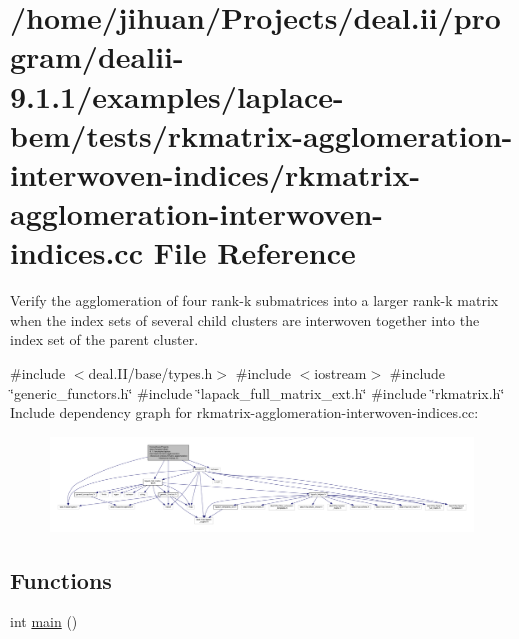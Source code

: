 \hypertarget{rkmatrix-agglomeration-interwoven-indices_8cc}{}\section{/home/jihuan/\+Projects/deal.ii/program/dealii-\/9.1.1/examples/laplace-\/bem/tests/rkmatrix-\/agglomeration-\/interwoven-\/indices/rkmatrix-\/agglomeration-\/interwoven-\/indices.cc File Reference}
\label{rkmatrix-agglomeration-interwoven-indices_8cc}


Verify the agglomeration of four rank-\/k submatrices into a larger rank-\/k matrix when the index sets of several child clusters are interwoven together into the index set of the parent cluster.  


{\ttfamily \#include $<$deal.\+I\+I/base/types.\+h$>$}\newline
{\ttfamily \#include $<$iostream$>$}\newline
{\ttfamily \#include \char`\"{}generic\+\_\+functors.\+h\char`\"{}}\newline
{\ttfamily \#include \char`\"{}lapack\+\_\+full\+\_\+matrix\+\_\+ext.\+h\char`\"{}}\newline
{\ttfamily \#include \char`\"{}rkmatrix.\+h\char`\"{}}\newline
Include dependency graph for rkmatrix-\/agglomeration-\/interwoven-\/indices.cc\+:\nopagebreak
\begin{figure}[H]
\begin{center}
\leavevmode
\includegraphics[width=350pt]{rkmatrix-agglomeration-interwoven-indices_8cc__incl}
\end{center}
\end{figure}
\subsection*{Functions}
\begin{DoxyCompactItemize}
\item 
int \hyperlink{rkmatrix-agglomeration-interwoven-indices_8cc_ae66f6b31b5ad750f1fe042a706a4e3d4}{main} ()
\end{DoxyCompactItemize}


